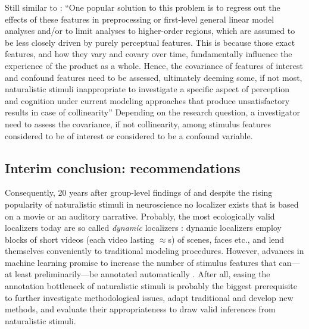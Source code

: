 %
Still similar to \citet{grall2022leveraging}: ``One popular solution to this
problem is to regress out the effects of these features in preprocessing or
first-level general linear model analyses and/or to limit analyses to
higher-order regions, which are assumed to be less closely driven by purely
perceptual features.
%
This is because those exact features, and how they vary and covary over time,
fundamentally influence the experience of the product as a whole.
%
Hence, the covariance of features of interest and confound features need to be
assessed, ultimately deeming some, if not most, naturalistic stimuli
inappropriate to investigate a specific aspect of perception and cognition under
current modeling approaches that produce unsatisfactory results in case of
collinearity''
%
Depending on the research question, a investigator need to assess the
covariance, if not collinearity, among stimulus features considered to be of
interest or considered to be a confound variable.


\subsection{Interim conclusion: recommendations}


%
Consequently, 20 years after group-level findings of \citep{bartels2004mapping}
and despite the rising popularity of naturalistic stimuli in neuroscience no
localizer exists that is based on a movie or an auditory narrative.
%
Probably, the most ecologically valid localizers today are so called
\textit{dynamic} localizers \citep[e.g.,][]{pitcher2011differential,
fox2009defining}:
%
dynamic localizers employ blocks of short videos (each video lasting
$\approx$\unit[2-3]{s}) of scenes, faces etc., and lend themselves conveniently
to traditional modeling procedures.
%
However, advances in machine learning promise to increase the number of stimulus
features that can---at least preliminarily---be annotated automatically
\citep[cf. the toolsbox ``pliers'' that is implemented in the platform
\href{https://neuroscout.org/}{\url{neuroscout.org}}
platform;][]{mcnamara2017developing, delavega2022neuroscout}.
%
After all, easing the annotation bottleneck of naturalistic stimuli is probably
the biggest prerequisite to further investigate methodological issues, adapt
traditional and develop new methods, and evaluate their appropriateness to draw
valid inferences from naturalistic stimuli.

